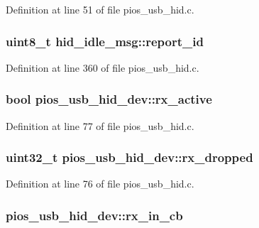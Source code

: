 \-Definition at line 51 of file pios\-\_\-usb\-\_\-hid.\-c.

\hypertarget{group___p_i_o_s___u_s_b___h_i_d_gae36ecdd57567fb6f4ee28b3130b3c8ee}{
\subsubsection[{report\-\_\-id}]{\setlength{\rightskip}{0pt plus 5cm}uint8\-\_\-t {\bf hid\-\_\-idle\-\_\-msg\-::report\-\_\-id}}}\label{group___p_i_o_s___u_s_b___h_i_d_gae36ecdd57567fb6f4ee28b3130b3c8ee}


\-Definition at line 360 of file pios\-\_\-usb\-\_\-hid.\-c.

\hypertarget{group___p_i_o_s___u_s_b___h_i_d_gaf4ed0035b90313acf78fada97b2ff2f5}{
\subsubsection[{rx\-\_\-active}]{\setlength{\rightskip}{0pt plus 5cm}bool {\bf pios\-\_\-usb\-\_\-hid\-\_\-dev\-::rx\-\_\-active}}}\label{group___p_i_o_s___u_s_b___h_i_d_gaf4ed0035b90313acf78fada97b2ff2f5}


\-Definition at line 77 of file pios\-\_\-usb\-\_\-hid.\-c.

\hypertarget{group___p_i_o_s___u_s_b___h_i_d_ga4ecf07921bfe18b2457b8d0c4c874990}{
\subsubsection[{rx\-\_\-dropped}]{\setlength{\rightskip}{0pt plus 5cm}uint32\-\_\-t {\bf pios\-\_\-usb\-\_\-hid\-\_\-dev\-::rx\-\_\-dropped}}}\label{group___p_i_o_s___u_s_b___h_i_d_ga4ecf07921bfe18b2457b8d0c4c874990}


\-Definition at line 76 of file pios\-\_\-usb\-\_\-hid.\-c.

\hypertarget{group___p_i_o_s___u_s_b___h_i_d_ga0d491f712337fdf9d08be6c72ac81094}{
\subsubsection[{rx\-\_\-in\-\_\-cb}]{ {\bf pios\-\_\-usb\-\_\-hid\-\_\-dev\-::rx\-\_\-in\-\_\-cb}}}\label{group___p_i_o_s___u_s_b___h_i_d_ga0d491f712337fdf9d08be6c72ac81094}


